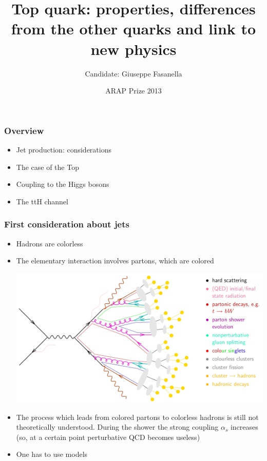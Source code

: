\documentclass[9pt, xcolor=dvipsnames]{beamer}
\title[Top quark]{Top quark: properties, differences from the other quarks and link to new physics}
\author[Giuseppe Fasanella]{Candidate: Giuseppe Fasanella}
\institute{Home Institute: ~``Sapienza'' Università di Roma}
\date{ARAP Prize 2013}
\begin{document}
\frame{
\titlepage 
}

\begin{frame}
 \frametitle{Overview}
\begin{itemize}
 \item Jet production: considerations
\pause
\bigskip
\item The case of the Top
\pause
\bigskip
\item Coupling to the Higgs bosons
\pause
\bigskip
\item The ttH channel
\end{itemize}
\end{frame}

\begin{frame}
\frametitle{First consideration about jets}
\begin{itemize}
 \item Hadrons are colorless
\item The elementary interaction involves partons, which are colored
\pause

\medskip
\begin{center}
\includegraphics[scale=0.3]{partonshower}
\end{center}
\end{itemize}
\begin{itemize}

\item The process which leads from colored partons to colorless hadrons is still not theoretically understood.
During the shower the strong coupling $\alpha_{s}$ increases (so, at a certain point perturbative QCD becomes useless)
\item One has to use models
\end{itemize}
\end{frame}
\end{document}
